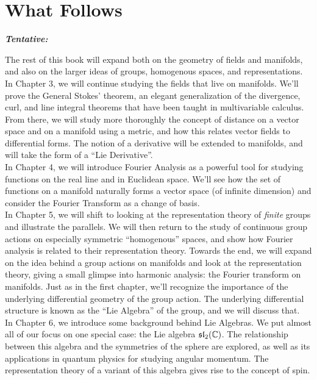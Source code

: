 	\section{What Follows} %
	\label{sec:what_follows}
	
	\begin{center}
		\textbf{\emph{{Tentative:}}}\\
	\end{center}
	The rest of this book will expand both on the geometry of fields and manifolds, and also on the larger ideas of groups, homogenous spaces, and representations. \\
	
	In Chapter 3, we will continue studying the fields that live on manifolds. We'll prove the General Stokes' theorem, an elegant generalization of the divergence, curl, and line integral theorems that have been taught in multivariable calculus. From there, we will study more thoroughly the concept of distance on a vector space and on a manifold using a metric, and how this relates vector fields to differential forms. The notion of a derivative will be extended to manifolds, and will take the form of a ``Lie Derivative''.\\
	
	In Chapter 4, we will introduce Fourier Analysis as a powerful tool for studying functions on the real line and in Euclidean space. We'll see how the set of functions on a manifold naturally forms a vector space (of infinite dimension) and consider the Fourier Transform as a change of basis. \\
	
	In Chapter 5, we will shift to looking at the representation theory of \emph{finite} groups and illustrate the parallels. We will then return to the study of continuous group actions on especially symmetric ``homogenous'' spaces, and show how Fourier analysis is related to their representation theory. Towards the end, we will expand on the idea behind a group actions on manifolds and look at the representation theory, giving a small glimpse into harmonic analysis: the Fourier transform on manifolds. Just as in the first chapter, we'll recognize the importance of the underlying differential geometry of the group action. The underlying differential structure is known as the ``Lie Algebra'' of the group, and we will discuss that.\\
	
	In Chapter 6, we introduce some background behind Lie Algebras. We put almost all of our focus on one special case: the Lie algebra $\frak{sl}_2 (\mathbb C)$. The relationship between this algebra and the symmetries of the sphere are explored, as well as its applications in quantum physics for studying angular momentum. The representation theory of a variant of this algebra gives rise to the concept of spin. \\
	
